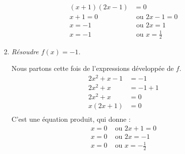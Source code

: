 \documentclass[12pt]{article}
\begin{document}
\begin{exercice}
\begin{enumerate}[(1)]
\begin{enumerate}
\begin{align*}
            \left( x+1 \right)\left( 2x-1 \right) &=0\\
            x+1=0 &\text{ ou } 2x-1=0\\
            x=-1 &\text{ ou } 2x=1\\
            x=-1 &\text{ ou } x=\frac{1}{2}
          \end{align*}
        \item \emph{Résoudre $f(x)=-1$.}
          \setlength{\columnseprule}{1pt}
          \begin{multicols}{2}
            Nous partons cette fois de l'expressions développée de $f$.
          \begin{align*}
            2x^2+x-1 &= -1\\
            2x^2+x &= -1+1\\
            2x^2+x &= 0\\
            x\left( 2x+1 \right) &=0\\
          \end{align*}
          C'est une équation produit, qui donne :
          \begin{align*}
            x=0 &\text{ ou } 2x+1=0\\
            x=0 &\text{ ou } 2x=-1\\
            x=0 &\text{ ou } x=-\frac{1}{2}
          \end{align*}
    \end{multicols}
      \end{enumerate}
  \end{enumerate}
\end{exercice}
\end{document}
